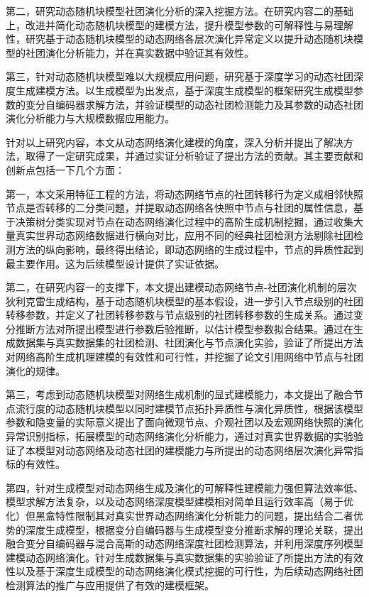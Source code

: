 第二，研究动态随机块模型社团演化分析的深入挖掘方法。在研究内容二的基础上，改进并简化动态随机块模型的建模方法，提升模型参数的可解释性与易理解性，研究基于动态随机块模型的动态网络各层次演化异常定义以提升动态随机块模型的社团演化分析能力，并在真实数据中验证其有效性。

第三，针对动态随机块模型难以大规模应用问题，研究基于深度学习的动态社团深度生成建模方法。以生成模型为出发点，基于深度生成模型的框架研究生成模型参数的变分自编码器求解方法，并验证模型的动态社团检测能力及其参数的动态社团演化分析能力与大规模数据应用能力。

针对以上研究内容，本文从动态网络演化建模的角度，深入分析并提出了解决方法，取得了一定研究成果，并通过实证分析验证了提出方法的贡献。其主要贡献和创新点包括一下几个方面：

第一，本文采用特征工程的方法，将动态网络节点的社团转移行为定义成相邻快照节点是否转移的二分类问题，并提取动态网络各快照中节点与社团的属性信息，基于决策树分类实现对节点在动态网络演化过程中的高阶生成机制挖掘，通过收集大量真实世界动态网络数据进行横向对比，应用不同的经典社团检测方法剔除社团检测方法的纵向影响，最终得出结论，即动态网络的生成过程中，节点的异质性起到最主要作用。这为后续模型设计提供了实证依据。

第二，在研究内容一的支撑下，本文提出建模动态网络节点-社团演化机制的层次狄利克雷生成结构，基于动态随机块模型的基本假设，进一步引入节点级别的社团转移参数，并定义了社团转移参数与节点级别的社团转移参数的生成关系。通过变分推断方法对所提出模型进行参数后验推断，以估计模型参数拟合结果。通过在生成数据集与真实数据集的社团检测、社团演化与节点演化实验，验证了所提出方法对网络高阶生成机理建模的有效性和可行性，并挖掘了论文引用网络中节点与社团演化的规律。

第三，考虑到动态随机块模型对网络生成机制的显式建模能力，本文提出了融合节点流行度的动态随机块模型以同时建模节点拓扑异质性与演化异质性，根据该模型参数和隐变量的实际意义提出了面向微观节点、介观社团以及宏观网络快照的演化异常识别指标，拓展模型的动态网络演化分析能力，通过对真实世界数据的实验验证了本模型对动态网络及动态社团的建模能力与所提出的动态网络层次演化异常指标的有效性。

第四，针对生成模型对动态网络生成及演化的可解释性建模能力强但算法效率低、模型求解方法复杂，以及动态网络深度模型建模相对简单且运行效率高（易于优化）但黑盒特性限制其对真实世界动态网络演化分析能力的问题，提出结合二者优势的深度生成模型，根据变分自编码器与生成模型变分推断求解的理论关联，提出融合变分自编码器与混合高斯的动态网络深度社团检测算法，并利用深度序列模型建模动态网络演化。针对生成数据集与真实数据集的实验验证了所提出方法的有效性以及基于深度生成模型的动态网络演化模式挖掘的可行性，为后续动态网络社团检测算法的推广与应用提供了有效的建模框架。

